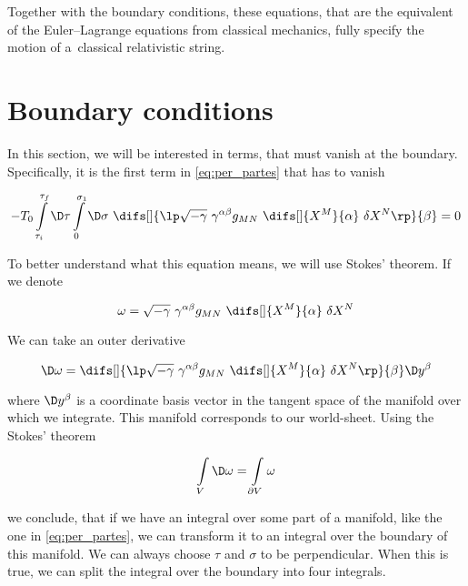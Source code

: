 \noindent
Together with the boundary conditions, these equations, that are the equivalent of the Euler--Lagrange equations from classical mechanics, fully specify the motion of a~classical relativistic string.




\section{Boundary conditions}
\label{sec:boundary_conditions}


In this section, we will be interested in terms, that must vanish at the boundary. Specifically, it is the first term in \cref{eq:per_partes} that has to vanish

\begin{equation}
    - T_0 \int\limits_{\tau_i}^{\tau_f} \D \tau \int\limits_{0}^{\sigma_1} \D \sigma ~ 
     \difs[] {\lp \sqrt{-\gamma} ~ \gamma^{\alpha \beta} g_{M N} ~ \difs[] {X^{M}} {\alpha} ~ \delta X^{N} \rp} {\beta} = 0
\end{equation}

\noindent
To better understand what this equation means, we will use Stokes' theorem. If we denote 

\begin{equation}
\label{eq:form_ppts}
    \omega = \sqrt{-\gamma} ~ \gamma^{\alpha \beta} g_{M N} ~ \difs[] {X^{M}} {\alpha} ~ \delta X^{N}
\end{equation}

\noindent
We can take an outer derivative 

\begin{equation}
\label{eq:diff_form_ppts}
    \D \omega = \difs[] {\lp \sqrt{-\gamma} ~ \gamma^{\alpha \beta} g_{M N} ~ \difs[] {X^{M}} {\alpha} ~ \delta X^{N} \rp} {\beta} \D y^{\beta}
\end{equation}

\noindent
where $\D y^{\beta}$ is a coordinate basis vector in the tangent space of the manifold over which we integrate. This manifold corresponds to our world-sheet. Using the Stokes' theorem

\begin{equation}
\label{eq:stokes}
    \int\limits_{V} \D \omega = \int\limits_{\partial V} \omega
\end{equation}

\noindent
we conclude, that if we have an integral over some part of a manifold, like the one in \cref{eq:per_partes}, we can transform it to an integral over the boundary of this manifold. We can always choose $\tau$ and $\sigma$ to be perpendicular. When this is true, we can split the integral over the boundary into four integrals.


